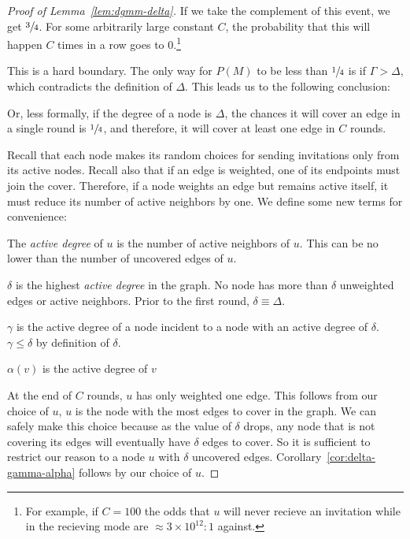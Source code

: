 \begin{proof}[Proof of Lemma~\ref{lem:dgmm-delta}]


If we take the complement of this event, we get $\sfrac{3}{4}$. For some arbitrarily large constant $C$, the probability that this will happen $C$ times in a row goes to 0.\footnote{For example, if $C = 100$ the odds that $u$ will never recieve an invitation while in the recieving mode are $\approx 3\times10^{12}:1$ against.} 

This is a hard boundary. The only way for $P(M)$ to be less than $\sfrac{1}{4}$ is if $\Gamma > \Delta$, which contradicts the definition of $\Delta$. This leads us to the following conclusion:



Or, less formally, if the degree of a node is $\Delta$, the chances it will cover an edge in a single round is $\sfrac{1}{4}$, and therefore, it will cover at least one edge in $C$ rounds.

Recall that each node makes its random choices for sending invitations only from its active nodes. Recall also that if an edge is weighted, one of its endpoints must join the cover. Therefore, if a node weights an edge but remains active itself, it must reduce its number of active neighbors by one. We define some new terms for convenience:
\begin{ldef}
The {\em active degree} of $u$ is the number of active neighbors of $u$. This can be no lower than the number of uncovered edges of $u$.
\end{ldef}
\begin{ldef}
$\delta$ is the highest {\em active degree} in the graph. No node has more than $\delta$ unweighted edges or active neighbors. Prior to the first round, $\delta \equiv \Delta$.
\end{ldef}
\begin{ldef}
$\gamma$ is the active degree of a node incident to a node with an active degree of $\delta$. $\gamma \le \delta$ by definition of $\delta$.
\end{ldef}
\begin{ldef}
$\alpha(v)$ is the active degree of $v$
\end{ldef} 

At the end of $C$ rounds, $u$ has only weighted one edge. This follows from our choice of $u$, $u$ is the node with the most edges to cover in the graph. We can safely make this choice because as the value of $\delta$ drops, any node that is not covering its edges will eventually have $\delta$ edges to cover. So it is sufficient to restrict our reason to a node $u$ with $\delta$ uncovered edges. Corollary~\ref{cor:delta-gamma-alpha} follows by our choice of $u$.


\end{proof}
